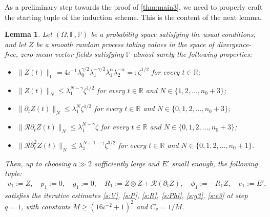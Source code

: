 \documentclass[10pt,a4paper]{amsart}
\numberwithin{equation}{section}
\numberwithin{corollario}{section}
\newtheorem{lemma}{Lemma}
\numberwithin{lemma}{section}
\numberwithin{prop}{section}
\theoremstyle{definition}
\theoremstyle{remark}
\newcommand{\R}{\mathbb{R}}
\begin{document}
As a preliminary step towards the proof of \autoref{thm:main3}, we need to properly craft the starting tuple of the induction scheme. This is the content of the next lemma.

\begin{lemma} \label{ass:Z}
Let $(\Omega,\mathbb{F},\mathbb{P})$ be a probability space satisfying the usual conditions, and let $Z$ be a smooth random process taking values in the space of divergence-free, zero-mean vector fields satisfying $\mathbb{P}$-almost surely the following properties:
\begin{itemize}
    \item $\| Z(t) \|_0 = 4\iota^{-1} \lambda_0^{\gamma/2}\lambda_1^{-\gamma/2}\lambda_1^{\alpha} \lambda_2^{-\alpha} =: \zeta^{1/2}$ for every $t \in \R$;
    \item $\| Z(t) \|_{N} \leq \lambda_1^{N-\gamma} \zeta^{1/2}$ for every $t \in \R$ and $N \in \{1,2,\dots,n_0+3\}$;
    \item $\| \partial_t Z(t) \|_{N} \leq \lambda_1^N \zeta^{1/2}$ for every $t \in \R$ and $N \in \{0,1,2,\dots,n_0+3\}$;
    \item $\| \mathcal{R}\partial_t Z(t) \|_{N} \leq \lambda_1^{N-\gamma} \zeta$ for every $t \in \R$ and $N \in \{0,1,2,\dots,n_0+3\}$;
    \item $\| \mathcal{R}\partial_t^2 Z(t) \|_{N} \leq \lambda_1^{N+1-\gamma} \zeta^{3/2}$ for every $t \in \R$ and $N \in \{0,1,2,\dots,n_0+1\}$.
\end{itemize}
Then, up to choosing $a \gg2$ sufficiently large and $E'$ small enough, the following tuple:
\begin{align}
    v_1 := Z,
    \quad
    p_1:=0,
    \quad
    g_1 := 0,
    \quad
    R_1 := Z \otimes Z + \mathcal{R}(\partial_t Z),
    \quad
    \phi _1 := -R_1 Z,
    \quad
    e_1 := E',
\end{align}
satisfies the iterative estimates \eqref{s:V}, \eqref{s:P}, \eqref{s:R}, \eqref{s:Phi}, \eqref{s:g3}, \eqref{s:e3} at step $q=1$, with constants $\overline{M} \geq (16\iota^{-2}+1)^2$ and $C_v = 1/\overline{M}$.
\end{lemma}
\end{document}
